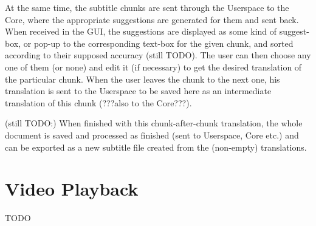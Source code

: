 At the same time, the subtitle chunks are sent through the Userspace to the Core, where the appropriate suggestions are generated for them and sent back. When received in the GUI, the suggestions are displayed as some kind of suggest-box, or pop-up to the corresponding text-box for the given chunk, and sorted according to their supposed accuracy (still TODO). The user can then choose any one of them (or none) and edit it (if necessary) to get the desired translation of the particular chunk. When the user leaves the chunk to the next one, his translation is sent to the Userspace to be saved here as an intermediate translation of this chunk (???also to the Core???).

(still TODO:)
When finished with this chunk-after-chunk translation, the whole document is saved and processed as finished (sent to Userspace, Core etc.) and can be exported as a new subtitle file created from the (non-empty) translations.

\section{Video Playback}

TODO 
